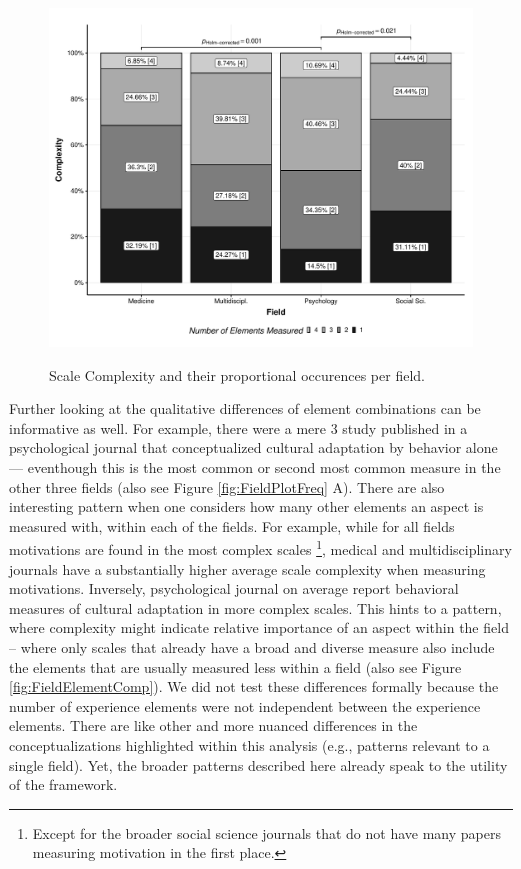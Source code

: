 \begin{figure}[h]
\centering
\caption{Scale Complexity and their proportional occurences per field.}
\includegraphics[width=\textwidth]{Figures/FieldPlotComplexityAverage-1}
\label{fig:FieldPlotComplexityAverage}
\end{figure}

Further looking at the qualitative differences of element combinations
can be informative as well. For example, there were a mere 3 study
published in a psychological journal that conceptualized cultural
adaptation by behavior alone --- eventhough this is the most common or
second most common measure in the other three fields (also see Figure
\ref{fig:FieldPlotFreq} A). There are also interesting pattern when one
considers how many other elements an aspect is measured with, within
each of the fields. For example, while for all fields motivations are
found in the most complex scales
\footnote{Except for the broader social science journals that do not have many papers measuring motivation in the first place.},
medical and multidisciplinary journals have a substantially higher
average scale complexity when measuring motivations. Inversely,
psychological journal on average report behavioral measures of cultural
adaptation in more complex scales. This hints to a pattern, where
complexity might indicate relative importance of an aspect within the
field -- where only scales that already have a broad and diverse measure
also include the elements that are usually measured less within a field
(also see Figure \ref{fig:FieldElementComp}). We did not test these
differences formally because the number of experience elements were not
independent between the experience elements. There are like other and
more nuanced differences in the conceptualizations highlighted within
this analysis (e.g., patterns relevant to a single field). Yet, the
broader patterns described here already speak to the utility of the
framework.

